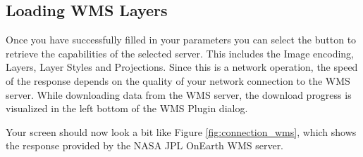 
\subsection{Loading WMS Layers}\label{sec:ogc-wms-layers}

Once you have successfully filled in your parameters you can select the
button to retrieve the capabilities of the selected server.  This includes the Image encoding,
Layers, Layer Styles and Projections.  Since this
is a network operation, the speed of the response depends on the quality of your network
connection to the WMS server. While downloading data from the WMS server, the download progress
is visualized in the left bottom of the WMS Plugin dialog.

Your screen should now look a bit like Figure \ref{fig:connection_wms}, which shows the
response provided by the NASA JPL OnEarth WMS server.


